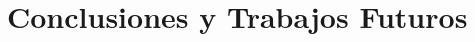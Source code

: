 \documentclass[a4paper,11pt]{book}
\begin{document}
	


\frontmatter
\tableofcontents
\listoffigures
\listoftables

\mainmatter
\setlength{\parskip}{5pt}






\chapter{Conclusiones y Trabajos Futuros}

\nocite{*}





%
%
%
\end{document}
